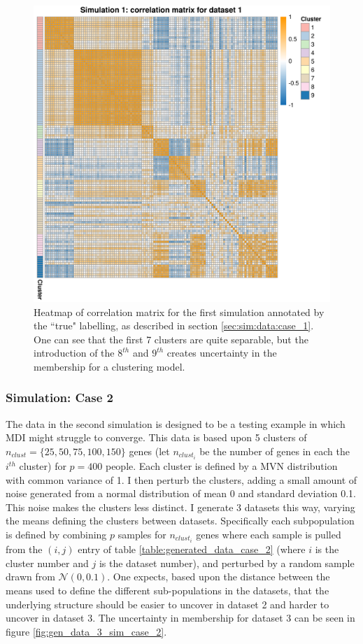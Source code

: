 \documentclass[12pt]{article} %
\begin{document}
	\begin{figure}[!htb]
		\centering
		\includegraphics[scale=0.65]{Images/Gen_data/Case_1/cor_matrix_dataset_1.png}
		\caption{Heatmap of correlation matrix for the first simulation annotated by the ``true" labelling, as described in section \ref{sec:sim:data:case_1}. One can see that the first 7 clusters are quite separable, but the introduction of the $8^{th}$ and $9^{th}$ creates uncertainty in the membership for a clustering model.}
		\label{fig:cor_matrix_1_sim_case_1}
	\end{figure}
	
	\subsubsection{Simulation: Case 2} \label{sec:sim:data:case_2}
	The data in the second simulation is designed to be a testing example in which MDI might struggle to converge. This data is based upon 5 clusters of $n_{clust}=\{25, 50, 75, 100, 150\}$ genes (let $n_{clust_i}$ be the number of genes in each the $i^{th}$ cluster) for $p=400$ people. Each cluster is defined by a MVN distribution with common variance of 1. I then perturb the clusters, adding a small amount of noise generated from a normal distribution of mean 0 and standard deviation 0.1. This noise makes the clusters less distinct. I generate 3 datasets this way, varying the means defining the clusters between datasets. Specifically each subpopulation is defined by combining $p$ samples for $n_{clust_i}$ genes where each sample is pulled from the $(i, j)$ entry of table \ref{table:generated_data_case_2} (where $i$ is the cluster number and $j$ is the dataset number), and perturbed by a random sample drawn from $\mathcal{N}(0,0.1)$. One expects, based upon the distance between the means used to define the different sub-populations in the datasets, that the underlying structure should be easier to uncover in dataset 2 and harder to uncover in dataset 3. The uncertainty in membership for dataset 3 can be seen in figure \ref{fig:gen_data_3_sim_case_2}.
\end{document}
